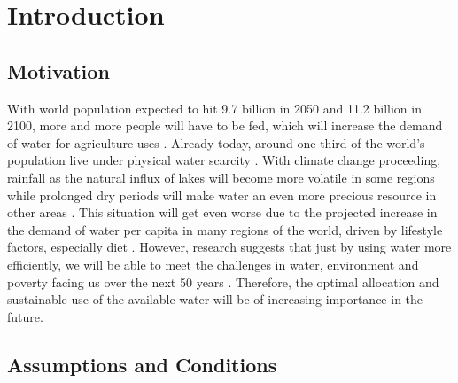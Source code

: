 \documentclass[12pt, a4paper, oneside]{article}
\begin{document}
	
	\tableofcontents
	\clearpage
	
	
	\section{Introduction}
	
	\subsection{Motivation}
With world population expected to hit 9.7 billion in 2050 and 11.2 billion in 2100, more and more people will have to be fed, which will increase the demand of water for agriculture uses \citep{un2019}.
Already today, around one third of the world's population live under physical water scarcity \citep{vorosmarty2000global, alcamo2003global, oki2006global}.
With climate change proceeding, rainfall as the natural influx of lakes will become more volatile in some regions while prolonged dry periods will make water an even more precious resource in other areas \citep{guhathakurta2011impact}.
This situation will get even worse due to the projected increase in the demand of water per capita in many regions of the world, driven by lifestyle factors, especially diet \citep{vorosmarty2000global}.
However, research suggests that just by using water more efficiently, we will be able to meet the challenges in water, environment and poverty facing us over the next 50 years \citep{molden2013water}.
Therefore, the optimal allocation and sustainable use of the available water will be of increasing importance in the future.


\subsection{Assumptions and Conditions}
\end{document}
